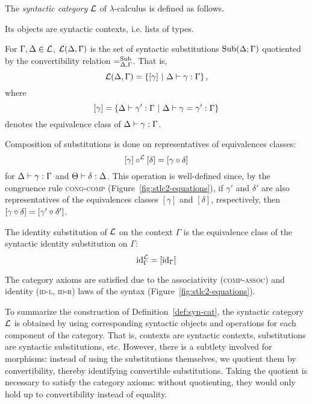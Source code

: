 \begin{defn} \label{def:syn-cat}
The \emph{syntactic category} $\syncat$ of $\lambda$-calculus is defined as follows.
\begin{enum}
    \item Its objects are syntactic contexts, i.e. lists of types.
    
    \item For $\Gamma, \Delta \in \syncat$, $\Hom[\syncat]{\Delta}{\Gamma}$ is the set of syntactic substitutions $\sSub{\Delta}{\Gamma}$ quotiented by the convertibility relation $\sconvrelsub{\Delta}{\Gamma}$. That is,
    \[ \Hom[\syncat]{\Delta}{\Gamma} = \setof{[\gamma]}{\stypedsub{\gamma}{\Delta}{\Gamma}}, \]
    where
    \[ [\gamma] = \setof{\stypedsub{\gamma'}{\Delta}{\Gamma}}{\sconvsub{\gamma}{\gamma'}{\Delta}{\Gamma}} \]
    denotes the equivalence class of $\stypedsub{\gamma}{\Delta}{\Gamma}$.
    
    \item Composition of substitutions is done on representatives of equivalences classes:
    \[ \Scompsub{[\gamma]}{[\delta]}[\syncat] = [\scompsub{\gamma}{\delta}] \]
    for $\stypedsub{\gamma}{\Delta}{\Gamma}$ and $\stypedsub{\delta}{\Theta}{\Delta}$. This operation is well-defined since, by the congruence rule \textsc{cong-comp} (Figure~\ref{fig:stlc2-equations}), if $\gamma'$ and $\delta'$ are also representatives of the equivalences classes $[\gamma]$ and $[\delta]$, respectively, then $[\scompsub{\gamma}{\delta}] = [\scompsub{\gamma'}{\delta'}]$.

    \item The identity substitution of $\syncat$ on the context $\Gamma$ is the equivalence class of the syntactic identity substitution on $\Gamma$:
    \[ \Sidsub[\Gamma][\syncat] = [\sidsub[\Gamma]] \]
\end{enum}
The category axioms are satisfied due to the associativity (\textsc{comp-assoc}) and identity (\textsc{id-l}, \textsc{id-r}) laws of the syntax (Figure~\ref{fig:stlc2-equations}).
\end{defn}

To summarize the construction of Definition~\ref{def:syn-cat}, the syntactic category $\syncat$ is obtained by using corresponding syntactic objects and operations for each component of the category. That is, contexts are syntactic contexts, substitutions are syntactic substitutions, etc. However, there is a subtlety involved for morphisms: instead of using the substitutions themselves, we quotient them by convertibility, thereby identifying convertible substitutions. Taking the quotient is necessary to satisfy the category axioms: without quotienting, they would only hold up to convertibility instead of equality.

